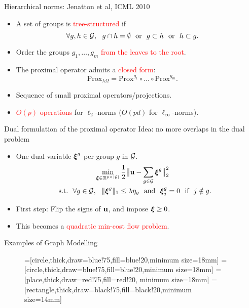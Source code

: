 \documentclass[final]{beamer}
\newcommand{\rred}[1]{{\textcolor{red}{#1}}}
\begin{document}
\begin{frame}{}
\begin{columns}[T]
\begin{column}{0.315\paperwidth}
\end{column}\hfill

\begin{column}{0.315\linewidth}
\begin{block}{Hierarchical norms: Jenatton et al, ICML 2010} 
\begin{itemize}
   \item A set of groups is \rred{tree-structured} if $$\forall g,h \in {\mathcal G},~~ g \cap h = \emptyset ~~\text{or}~~ g \subset h ~~\text{or}~~ h \subset g.$$
   \item Order the groups $g_1,\ldots,g_m$ \rred{from the leaves to the root}.
   \item The proximal operator admits a \rred{closed form}: $$\text{Prox}_{\lambda\Omega} = \text{Prox}^{g_1} \circ \ldots \circ \text{Prox}^{g_m}.$$
   \item Sequence of small proximal operators/projections.
   \item \rred{$O(p)$ operations} for $\ell_2$-norms ($O(pd)$ for $\ell_\infty$-norms).
\end{itemize}
\end{block}
\begin{block}{Dual formulation of the proximal operator} 
   {\color{red} Idea: no more overlaps in the dual problem}
\begin{itemize}
\item One dual variable ${\boldsymbol\xi}^g$ per group $g$ in ${\mathcal G}$.
{\large
\begin{multline*}
\min_{{\boldsymbol\xi} \in {\mathbb R}^{p \times |{\mathcal G}|}} \frac{1}{2}\big\| {\mathbf u} - \sum_{g \in {\mathcal G}} {\boldsymbol\xi}^g \big\|_2^2 \\ ~~\text{s.t.}~~ \forall g \in {\mathcal G},~~ \|{\boldsymbol\xi}^g\|_1 \leq \lambda\eta_g ~~\text{and}~~ {\boldsymbol\xi}^g_j = 0 ~~\text{if}~~ j \notin g.
\end{multline*}
}
\item First step: Flip the signs of ${\mathbf u}$, and impose ${\boldsymbol\xi} \geq 0$.
\item This becomes a \rred{quadratic min-cost flow problem}.
\end{itemize}
\end{block}
\begin{block}{Examples of Graph Modelling}
\small{
\begin{figure}[hbtp!]
=[circle,thick,draw=blue!75,fill=blue!20,minimum size=18mm]
=[circle,thick,draw=blue!75,fill=blue!20,minimum size=18mm]
=[place,thick,draw=red!75,fill=red!20, minimum size=18mm]
=[rectangle,thick,draw=black!75,fill=black!20,minimum size=14mm]

\end{figure}}
\end{block}
\end{column}
\end{columns}
\end{frame}
\end{document}
